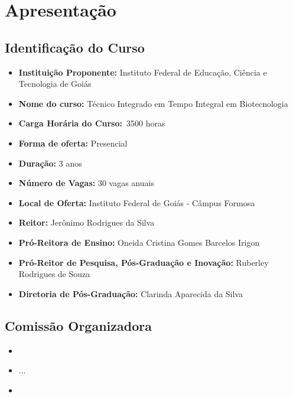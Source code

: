 \documentclass[11pt,fleqn]{book} %
\newcommand{\VER}[1]{\begingroup\color{red}#1\endgroup}
\begin{document}
\renewcommand\contentsname{Sumário}
\tableofcontents

\chapter{Apresentação}
\vspace{6em}
\begin{flushright}
	\textit{ }
\end{flushright}
\vspace{12em}
\indent


\section{Identificação do Curso}
\begin{itemize}
	\item \textbf{Instituição Proponente:} Instituto Federal de Educação, Ciência e Tecnologia de Goiás
	\item \textbf{Nome do curso:} Técnico Integrado em Tempo Integral em Biotecnologia
	\item \textbf{Carga Horária do Curso:}~\VER{3500} horas
	\item \textbf{Forma de oferta:} Presencial
	\item \textbf{Duração:} 3 anos
	\item \textbf{Número de Vagas:} 30 vagas anuais
	\item \textbf{Local de Oferta:} Instituto Federal de Goiás - Câmpus Formosa
	\item \textbf{Reitor:} Jerônimo Rodrigues da Silva
	\item \textbf{Pró-Reitora de Ensino:} Oneida Cristina Gomes Barcelos Irigon
	\item \textbf{Pró-Reitor de Pesquisa, Pós-Graduação e Inovação:} Ruberley Rodrigues de Souza
	\item \textbf{Diretoria de Pós-Graduação:} Clarinda Aparecida da Silva
\end{itemize}

\newpage  
\section{Comissão Organizadora}
	\begin{itemize}[label=\bfseries]
		\item {}
		\item ...
		\item {}
	\end{itemize}
\end{document}
